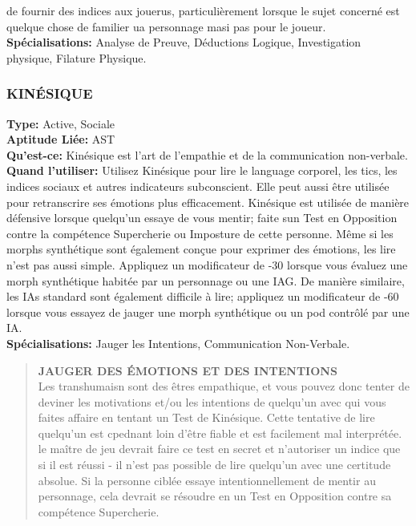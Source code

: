de fournir des indices aux jouerus, particulièrement lorsque le sujet concerné est quelque chose de familier ua personnage masi pas pour le joueur. \\ \textbf{Spécialisations:} Analyse de Preuve, Déductions Logique, Investigation physique, Filature Physique. 

\subsubsection{KINÉSIQUE} \textbf{Type:} Active, Sociale \\ \textbf{Aptitude Liée:} AST \\ \textbf{Qu'est-ce:} Kinésique est l'art de l'empathie et de la communication non-verbale. \\ \textbf{Quand l'utiliser:} Utilisez Kinésique pour lire le language corporel, les tics, les indices sociaux et autres indicateurs subconscient. Elle peut aussi être utilisée pour retranscrire ses émotions plus efficacement. Kinésique est utilisée de manière défensive lorsque quelqu'un essaye de vous mentir; faite sun Test en Opposition contre la compétence Supercherie ou Imposture de cette personne. Même si les morphs synthétique sont également conçue pour exprimer des émotions, les lire n'est pas aussi simple. Appliquez un modificateur de -30 lorsque vous évaluez une morph synthétique habitée par un personnage ou une IAG. De manière similaire, les IAs standard sont également difficile à lire; appliquez un modificateur de -60 lorsque vous essayez de jauger une morph synthétique ou un pod contrôlé par une IA. \\ \textbf{Spécialisations:} Jauger les Intentions, Communication Non-Verbale. 

\begin{quotation} \textbf{JAUGER DES ÉMOTIONS ET DES INTENTIONS} \\ Les transhumaisn sont des êtres empathique, et vous pouvez donc tenter de deviner les motivations et/ou les intentions de quelqu'un avec qui vous faites affaire en tentant un Test de Kinésique. Cette tentative de lire quelqu'un est cpednant loin d'être fiable et est facilement mal interprétée. le maître de jeu devrait faire ce test en secret et n'autoriser un indice que si il est réussi - il n'est pas possible de lire quelqu'un avec une certitude absolue. Si la personne ciblée essaye intentionnellement de mentir au personnage, cela devrait se résoudre en un Test en Opposition contre sa compétence Supercherie. \end{quotation} 

